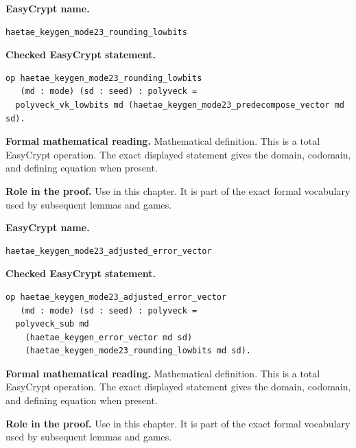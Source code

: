 \begin{formaldefinition}
\noindent\textbf{EasyCrypt name.}
\begin{lstlisting}[language=EasyCrypt,basicstyle=\ttfamily\scriptsize]
haetae_keygen_mode23_rounding_lowbits
\end{lstlisting}
\noindent\textbf{Checked EasyCrypt statement.}
\begin{lstlisting}[language=EasyCrypt,basicstyle=\ttfamily\scriptsize]
op haetae_keygen_mode23_rounding_lowbits
   (md : mode) (sd : seed) : polyveck =
  polyveck_vk_lowbits md (haetae_keygen_mode23_predecompose_vector md sd).
\end{lstlisting}
\noindent\textbf{Formal mathematical reading.}
Mathematical definition. This is a total EasyCrypt operation.  The exact displayed statement gives the domain, codomain, and defining equation when present.

\noindent\textbf{Role in the proof.}
Use in this chapter. It is part of the exact formal vocabulary used by subsequent lemmas and games.

\end{formaldefinition}

\begin{formaldefinition}
\noindent\textbf{EasyCrypt name.}
\begin{lstlisting}[language=EasyCrypt,basicstyle=\ttfamily\scriptsize]
haetae_keygen_mode23_adjusted_error_vector
\end{lstlisting}
\noindent\textbf{Checked EasyCrypt statement.}
\begin{lstlisting}[language=EasyCrypt,basicstyle=\ttfamily\scriptsize]
op haetae_keygen_mode23_adjusted_error_vector
   (md : mode) (sd : seed) : polyveck =
  polyveck_sub md
    (haetae_keygen_error_vector md sd)
    (haetae_keygen_mode23_rounding_lowbits md sd).
\end{lstlisting}
\noindent\textbf{Formal mathematical reading.}
Mathematical definition. This is a total EasyCrypt operation.  The exact displayed statement gives the domain, codomain, and defining equation when present.

\noindent\textbf{Role in the proof.}
Use in this chapter. It is part of the exact formal vocabulary used by subsequent lemmas and games.

\end{formaldefinition}


